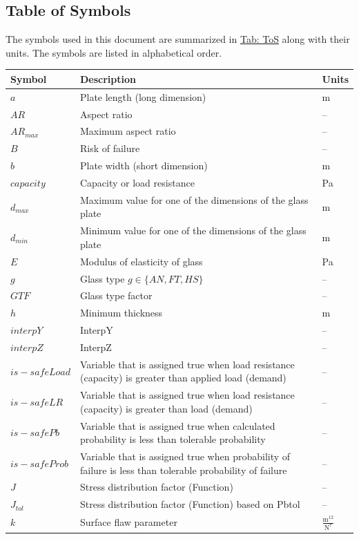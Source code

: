 \documentclass[12pt]{article}
\begin{document}
\subsection{Table of Symbols}
\label{Sec:ToS}
The symbols used in this document are summarized in \hyperref[Table:ToS]{Tab: ToS} along with their units. The symbols are listed in alphabetical order.
\begin{longtabu}{l X[l] l}
\toprule
\textbf{Symbol} & \textbf{Description} & \textbf{Units}
\\
\midrule
\endhead
$a$ & Plate length (long dimension) & m
\\
$AR$ & Aspect ratio & --
\\
${AR_{max}}$ & Maximum aspect ratio & --
\\
$B$ & Risk of failure & --
\\
$b$ & Plate width (short dimension) & m
\\
$capacity$ & Capacity or load resistance & Pa
\\
${d_{max}}$ & Maximum value for one of the dimensions of the glass plate & m
\\
${d_{min}}$ & Minimum value for one of the dimensions of the glass plate & m
\\
$E$ & Modulus of elasticity of glass & Pa
\\
$g$ & Glass type $g\in{}\{AN,FT,HS\}$ & --
\\
$GTF$ & Glass type factor & --
\\
$h$ & Minimum thickness & m
\\
$interpY$ & InterpY & --
\\
$interpZ$ & InterpZ & --
\\
$is-safeLoad$ & Variable that is assigned true when load resistance (capacity) is greater than applied load (demand) & --
\\
$is-safeLR$ & Variable that is assigned true when load resistance (capacity) is greater than load (demand) & --
\\
$is-safePb$ & Variable that is assigned true when calculated probability is less than tolerable probability & --
\\
$is-safeProb$ & Variable that is assigned true when probability of failure is less than tolerable probability of failure & --
\\
$J$ & Stress distribution factor (Function) & --
\\
${J_{tol}}$ & Stress distribution factor (Function) based on Pbtol & --
\\
$k$ & Surface flaw parameter & $\frac{\text{m}^{12}}{\text{N}^{7}}$

\end{longtabu}
\end{document}
